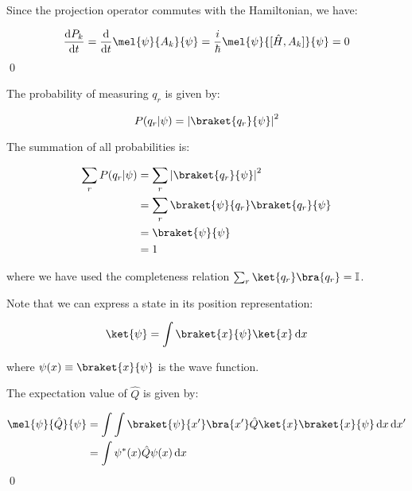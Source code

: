 \documentclass[12pt]{article}
\begin{document}
Since the projection operator commutes with the Hamiltonian, we have:

\begin{equation}
    \frac{\mathrm{d}P_{k}}{\mathrm{d}t} = \frac{\mathrm{d}}{\mathrm{d}t} \mel{\psi}{A_{k}}{\psi} = \frac{i}{\hbar} \mel{\psi}{[\hat{H}, A_{k}]}{\psi} = 0
\end{equation}
\qed


The probability of measuring $q_{r}$ is given by:

\begin{equation}
    P(q_{r} | \psi) = \left\lvert \braket{q_{r}}{\psi} \right\rvert^{2}
\end{equation}

The summation of all probabilities is:

\begin{equation}
    \begin{split}
        \sum_{r} P(q_{r} | \psi) &= \sum_{r} \left\lvert \braket{q_{r}}{\psi} \right\rvert^{2} \\
        &= \sum_{r} \braket{\psi}{q_{r}} \braket{q_{r}}{\psi} \\
        &= \braket{\psi}{\psi} \\
        &= 1
    \end{split}
\end{equation}

where we have used the completeness relation $\sum_{r} \ket{q_{r}} \bra{q_{r}} = \mathbb{I}$.

Note that we can express a state in its position representation:

\begin{equation}
    \ket{\psi} = \int \braket{x}{\psi} \ket{x} \, \mathrm{d}x
\end{equation}

where $\psi(x) \equiv \braket{x}{\psi}$ is the wave function.

The expectation value of $\hat{Q}$ is given by:

\begin{equation}
    \begin{split}
        \mel{\psi}{\hat{Q}}{\psi} &= \int \int \braket{\psi}{x'} \bra{x'} \hat{Q} \ket{x} \braket{x}{\psi} \, \mathrm{d}x \, \mathrm{d}x' \\
        &= \int \psi^{*}(x) \hat{Q} \psi(x) \, \mathrm{d}x
    \end{split}
\end{equation}
\qed


\end{document}
